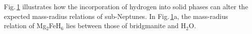 \documentclass[draft,jgrga,12pt]{agujournal2019}
\begin{document}
\begin{figure}
{    %
    }
    \label{fig:M-R}
\end{figure}



Fig.\,\ref{fig:M-R} illustrates how the incorporation of hydrogen into solid phases can alter the expected mass-radius relations of sub-Neptunes. 
In Fig.\,\ref{fig:M-R}a, the mass-radius relation of Mg$_2$FeH$_6$ lies between those of bridgmanite and H$_2$O.
\end{document}
